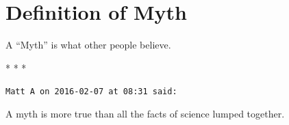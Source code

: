 \section{Definition of Myth}

A ``Myth'' is what other people believe.



\begin{center}* * *\end{center}

\begin{footnotesize}
\begin{sffamily}
\texttt{Matt A on 2016-02-07 at 08:31 said:}

A myth is more true than all the facts of science lumped together.

\end{sffamily}
\end{footnotesize}

